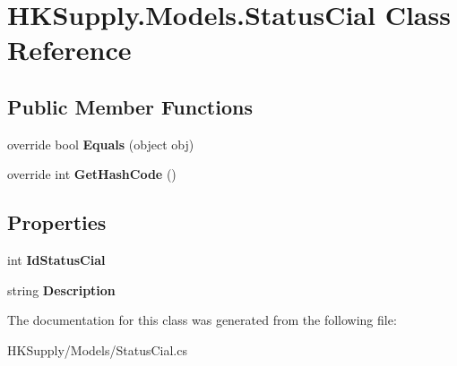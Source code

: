 \hypertarget{class_h_k_supply_1_1_models_1_1_status_cial}{}\section{H\+K\+Supply.\+Models.\+Status\+Cial Class Reference}
\label{class_h_k_supply_1_1_models_1_1_status_cial}
\subsection*{Public Member Functions}
\begin{DoxyCompactItemize}
\item 
\mbox{\label{class_h_k_supply_1_1_models_1_1_status_cial_ac9d56e62abc3cf19c9627b8d5613011b}} 
override bool {\bfseries Equals} (object obj)
\item 
\mbox{\label{class_h_k_supply_1_1_models_1_1_status_cial_aba51d1134c02c11cc7e6a2dd4111f2d3}} 
override int {\bfseries Get\+Hash\+Code} ()
\end{DoxyCompactItemize}
\subsection*{Properties}
\begin{DoxyCompactItemize}
\item 
\mbox{\label{class_h_k_supply_1_1_models_1_1_status_cial_a3f2701e0554f6f116622977135fdf0ba}} 
int {\bfseries Id\+Status\+Cial}
\item 
\mbox{\label{class_h_k_supply_1_1_models_1_1_status_cial_a512212b59a483a01bc32341ccf102b2c}} 
string {\bfseries Description}
\end{DoxyCompactItemize}


The documentation for this class was generated from the following file\+:\begin{DoxyCompactItemize}
\item 
H\+K\+Supply/\+Models/Status\+Cial.\+cs\end{DoxyCompactItemize}
